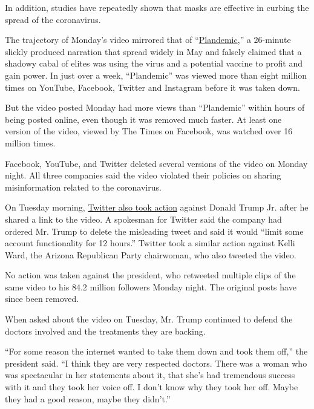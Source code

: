 In addition, studies have repeatedly shown that masks are effective in
curbing the spread of the coronavirus.

The trajectory of Monday's video mirrored that of
``\href{https://www.nytimes3xbfgragh.onion/2020/05/20/technology/plandemic-movie-youtube-facebook-coronavirus.html}{Plandemic},''
a 26-minute slickly produced narration that spread widely in May and
falsely claimed that a shadowy cabal of elites was using the virus and a
potential vaccine to profit and gain power. In just over a week,
``Plandemic'' was viewed more than eight million times on YouTube,
Facebook, Twitter and Instagram before it was taken down.

But the video posted Monday had more views than ``Plandemic'' within
hours of being posted online, even though it was removed much faster. At
least one version of the video, viewed by The Times on Facebook, was
watched over 16 million times.

Facebook, YouTube, and Twitter deleted several versions of the video on
Monday night. All three companies said the video violated their policies
on sharing misinformation related to the coronavirus.

On Tuesday morning,
\href{https://www.nytimes3xbfgragh.onion/live/2020/07/28/business/stock-market-today-coronavirus/twitter-limits-donald-trump-jrs-account-after-he-shares-virus-misinformation}{Twitter
also took action} against Donald Trump Jr. after he shared a link to the
video. A spokesman for Twitter said the company had ordered Mr. Trump to
delete the misleading tweet and said it would ``limit some account
functionality for 12 hours.'' Twitter took a similar action against
Kelli Ward, the Arizona Republican Party chairwoman, who also tweeted
the video.

No action was taken against the president, who retweeted multiple clips
of the same video to his 84.2 million followers Monday night. The
original posts have since been removed.

When asked about the video on Tuesday, Mr. Trump continued to defend the
doctors involved and the treatments they are backing.

``For some reason the internet wanted to take them down and took them
off,'' the president said. ``I think they are very respected doctors.
There was a woman who was spectacular in her statements about it, that
she's had tremendous success with it and they took her voice off. I
don't know why they took her off. Maybe they had a good reason, maybe
they didn't.''

